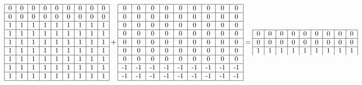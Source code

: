\documentclass{article}
\begin{document}
\begin{equation}
    \begin{tabular}{ | c | c | c | c | c | c | c | c | c | }
        \hline
        0 & 0 & 0 & 0 & 0 & 0 & 0 & 0 & 0 \\ 
        \hline
        0 & 0 & 0 & 0 & 0 & 0 & 0 & 0 & 0 \\ 
        \hline
        1 & 1 & 1 & 1 & 1 & 1 & 1 & 1 & 1 \\ 
        \hline
        1 & 1 & 1 & 1 & 1 & 1 & 1 & 1 & 1 \\ 
        \hline
        1 & 1 & 1 & 1 & 1 & 1 & 1 & 1 & 1 \\ 
        \hline
        1 & 1 & 1 & 1 & 1 & 1 & 1 & 1 & 1 \\ 
        \hline
        1 & 1 & 1 & 1 & 1 & 1 & 1 & 1 & 1 \\ 
        \hline
        1 & 1 & 1 & 1 & 1 & 1 & 1 & 1 & 1 \\ 
        \hline
        1 & 1 & 1 & 1 & 1 & 1 & 1 & 1 & 1 \\ 
        \hline
    \end{tabular} + \begin{tabular}{ | c | c | c | c | c | c | c | c | c | }
        \hline
        0 & 0 & 0 & 0 & 0 & 0 & 0 & 0 & 0 \\ 
        \hline
        0 & 0 & 0 & 0 & 0 & 0 & 0 & 0 & 0 \\ 
        \hline
        0 & 0 & 0 & 0 & 0 & 0 & 0 & 0 & 0 \\ 
        \hline
        0 & 0 & 0 & 0 & 0 & 0 & 0 & 0 & 0 \\ 
        \hline
        0 & 0 & 0 & 0 & 0 & 0 & 0 & 0 & 0 \\ 
        \hline
        0 & 0 & 0 & 0 & 0 & 0 & 0 & 0 & 0 \\ 
        \hline
        0 & 0 & 0 & 0 & 0 & 0 & 0 & 0 & 0 \\ 
        \hline
        -1 & -1 & -1 & -1 & -1 & -1 & -1 & -1 & -1 \\ 
        \hline
        -1 & -1 & -1 & -1 & -1 & -1 & -1 & -1 & -1 \\ 
        \hline
    \end{tabular} = 
    \begin{tabular}{ | c | c | c | c | c | c | c | c | c | }
        \hline
        0 & 0 & 0 & 0 & 0 & 0 & 0 & 0 & 0 \\ 
        \hline
        0 & 0 & 0 & 0 & 0 & 0 & 0 & 0 & 0 \\ 
        \hline
        1 & 1 & 1 & 1 & 1 & 1 & 1 & 1 & 1 \\ 

\end{tabular}
\end{equation}
\end{document}
